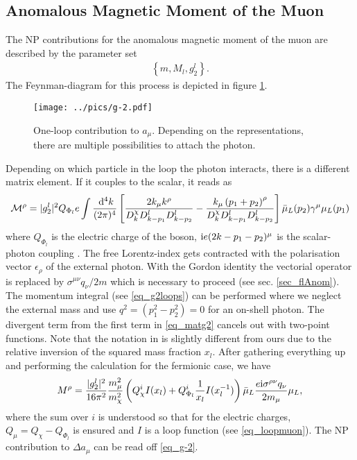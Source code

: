 \subsection{Anomalous Magnetic Moment of the Muon}
The NP contributions for the anomalous magnetic moment of the muon are described by the parameter set 
\begin{align}
 \left\{m, M_l, g_2^l\right\}.
\end{align}
The Feynman-diagram for this process is depicted in figure \ref{pic_g-2}. 
\begin{figure}[t]
 \texttt{[image: ../pics/g-2.pdf]}
 \caption{One-loop contribution to $a_\mu$. Depending on the representations, there are multiple possibilities to attach the photon.}
 \label{pic_g-2}
\end{figure}
Depending on which particle in the loop the photon interacts, there is a different matrix element. If it couples to the scalar, it reads as
\begin{align}
 \mathcal{M}^\rho = |g_2^l|^2 Q_{\Phi_l} e \int\frac{\; \mathrm{d}^4 k}{(2\pi)^4} \left[ \frac{2k_\mu k^\rho}{D^\chi_kD^l_{k-p_1}D^l_{k-p_2}} - \frac{k_\mu\left(p_1 +p_2\right)^\rho}{D^\chi_kD^l_{k-p_1}D^l_{k-p_2}} \right] \bar\mu_L(p_2)\gamma^\mu\mu_L(p_1) 
 \label{eq_matg2}
\end{align}
where $Q_{\Phi_l}$ is the electric charge of the boson, $\text{i} e(2k-p_1-p_2)^\mu$ is the scalar-photon coupling \cite{MDSchwartz}. 
The free Lorentz-index gets contracted with
the polarisation vector $\epsilon_\rho$ of the external photon. With the Gordon identity the vectorial operator is replaced by 
$\sigma^{\mu\nu}q_\nu/2m$ which is necessary to proceed (see sec. \ref{sec_flAnom}). The momentum integral (see \eqref{eq_g2loops})
can be performed \cite{Lavoura} 
where we neglect the external mass and use $q^2=(p_1^2-p_2^2) = 0$ for an on-shell photon. The divergent term from the first term in \eqref{eq_matg2}
cancels out with two-point functions. 
Note that the notation in \cite{Lavoura} is slightly different from ours due to the relative inversion of the squared mass 
fraction $x_l$. 
After gathering everything up and performing the calculation for the fermionic case, we have
\begin{align}
 M^\rho = \frac{|g^l_2|^2}{16\pi^2} \frac{m^2_\mu}{m_\chi^2}\left(Q_\chi^i I(x_l) + Q_{\Phi_l}^i \frac{1}{x_l} I(x_l^{-1}) \right) \bar \mu_L\frac{e\text{i}\sigma^{\rho\nu}q_\nu}{2m_\mu} \mu_L,
 \label{eq_g-2}
\end{align}
where the sum over $i$ is understood so that for the electric charges, $Q_\mu = Q_\chi - Q_{\Phi_l}$ is ensured and $I$ is a loop function 
(see \eqref{eq_loopmuon}). The NP contribution to $\Delta a_\mu$ can be read off \eqref{eq_g-2}.
